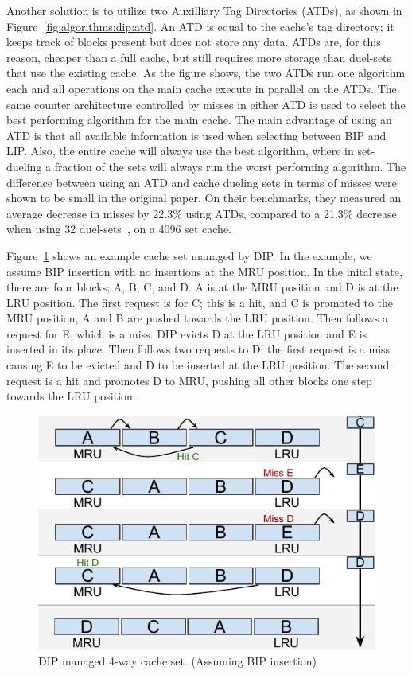 Another solution is to utilize two Auxilliary Tag Directories (ATDs), as shown in Figure~\ref{fig:algorithms:dip:atd}.
An ATD is equal to the cache's tag directory; it keeps track of blocks present but does not store any data.
ATDs are, for this reason, cheaper than a full cache, but still requires more storage than duel-sets that use the existing cache.
As the figure shows, the two ATDs run one algorithm each and all operations on the main cache execute in parallel on the ATDs.
The same counter architecture controlled by misses in either ATD is used to select the best performing algorithm for the main cache.
The main advantage of using an ATD is that all available information is used when selecting between BIP and LIP.
Also, the entire cache will always use the best algorithm, where in set-dueling a fraction of the sets will always run the worst performing algorithm.
The difference between using an ATD and cache dueling sets in terms of misses were shown to be small in the original paper.
On their benchmarks, they measured an average decrease in misses by 22.3\% using ATDs, compared to a 21.3\% decrease when using 32 duel-sets~\cite{Qureshi2007}, on a 4096 set cache.

Figure~\ref{fig:algorithms:bip_example} shows an example cache set managed by DIP.
In the example, we assume BIP insertion with no insertions at the MRU position.
In the inital state, there are four blocks; A, B, C, and D.
A is at the MRU position and D is at the LRU position.
The first request is for C; this is a hit, and C is promoted to the MRU position, A and B are pushed towards the LRU position.
Then follows a request for E, which is a miss.
DIP evicts D at the LRU position and E is inserted in its place.
Then follows two requests to D; the first request is a miss causing E to be evicted and D to be inserted at the LRU position.
The second request is a hit and promotes D to MRU, pushing all other blocks one step towards the LRU position.

\begin{figure}[ht]
    \centering
    \includegraphics[width=.65\textwidth]{figures/algorithms/DIP}
    \caption[DIP managed 4-way cache set.]{DIP managed 4-way cache set. (Assuming BIP insertion)}
    \label{fig:algorithms:bip_example}
\end{figure}
